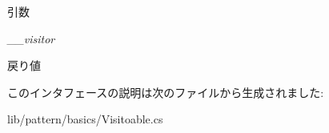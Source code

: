 \begin{DoxyParams}{引数}
\item[{\em \_\-\_\-visitor}]\end{DoxyParams}
\begin{DoxyReturn}{戻り値}

\end{DoxyReturn}


このインタフェースの説明は次のファイルから生成されました:\begin{DoxyCompactItemize}
\item 
lib/pattern/basics/Visitoable.cs\end{DoxyCompactItemize}

